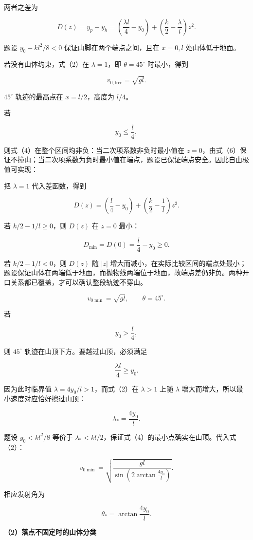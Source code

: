 \documentclass[12pt,a4paper,UTF8]{ctexart}
\begin{document}
两者之差为

\[D(z)=y_p-y_h
=\left(\frac{\lambda l}{4}-y_0\right)
+\left(\frac k2-\frac\lambda l\right)z^2. \tag{4}\]

题设 \(y_0-kl^2/8<0\) 保证山脚在两个端点之间，且在 \(x=0,l\)
处山体低于地面。

若没有山体约束，式（2）在 \(\lambda=1\)，即 \(\theta=45^\circ\)
时最小，得到

\[v_{0,\mathrm{free}}=\sqrt{gl}. \tag{5}\]

\(45^\circ\) 轨迹的最高点在 \(x=l/2\)，高度为 \(l/4\)。

若

\[y_0\leq\frac l4, \tag{6}\]

则式（4）在整个区间均非负：当二次项系数非负时最小值在
\(z=0\)，由式（6）保证不撞山；当二次项系数为负时最小值在端点，题设已保证端点安全。因此自由极值可实现：

把 \(\lambda=1\) 代入差函数，得到

\[D(z)=\left(\frac l4-y_0\right)
+\left(\frac k2-\frac1l\right)z^2.\]

若 \(k/2-1/l\geq0\)，则 \(D(z)\) 在 \(z=0\) 最小：

\[D_{\min}=D(0)=\frac l4-y_0\geq0.\]

若 \(k/2-1/l<0\)，则 \(D(z)\) 随 \(|z|\)
增大而减小，在实际比较区间的端点处最小；题设保证山体在两端低于地面，而抛物线两端位于地面，故端点差仍非负。两种开口关系都已覆盖，才可以确认整段轨迹不穿山。

\[\boxed{v_{0\min}=\sqrt{gl},\qquad\theta=45^\circ}. \tag{7}\]

若

\[y_0>\frac l4, \tag{8}\]

则 \(45^\circ\) 轨迹在山顶下方。要越过山顶，必须满足

\[\frac{\lambda l}{4}\geq y_0.\]

因为此时临界值 \(\lambda=4y_0/l>1\)，而式（2）在 \(\lambda>1\) 上随
\(\lambda\) 增大而增大，所以最小速度对应恰好擦过山顶：

\[\lambda_*=\frac{4y_0}{l}. \tag{9}\]

题设 \(y_0<kl^2/8\) 等价于
\(\lambda_*<kl/2\)，保证式（4）的最小点确实在山顶。代入式（2）：

\[\boxed{
v_{0\min}
=\sqrt{\frac{gl}{\sin\left(2\arctan\frac{4y_0}{l}\right)}}
}. \tag{10}\]

相应发射角为

\[\boxed{\theta_*=\arctan\frac{4y_0}{l}}. \tag{11}\]

\textbf{（2）落点不固定时的山体分类}
\end{document}
